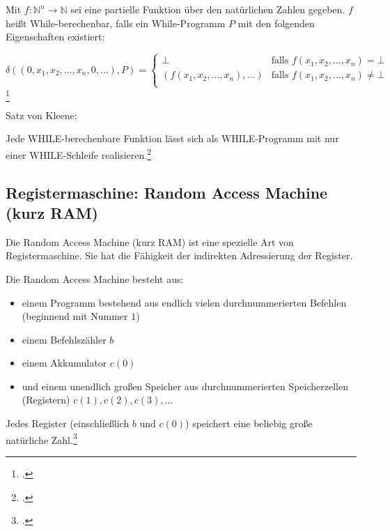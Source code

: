 \documentclass{bschlangaul-theorie}
\begin{document}
Mit $f : \mathbb{N}^n \rightarrow \mathbb{N}$ sei eine partielle
Funktion über den natürlichen Zahlen gegeben. $f$ heißt
While-berechenbar, falls ein While-Programm $P$ mit den folgenden
Eigenschaften existiert:

\begin{equation*}
\delta((0,x_1,x_2,\dots,x_n,0,\dots), P) =
\begin{cases}
\bot &
\text{falls } f(x_1,x_2,\dots,x_n) = \bot\\

(f(x_1,x_2,\dots,x_n), \dots) &
\text{falls }f(x_1,x_2,\dots,x_n) \neq \bot\\
\end{cases}
\end{equation*}\footcite[Seite 261]{hoffmann}

Satz von Kleene:

Jede WHILE-berechenbare Funktion lässt sich als WHILE-Programm mit nur
einer WHILE-Schleife realisieren.\footcite[Seite 13]{theo:fs:4}

%

\subsection{Registermaschine: Random Access Machine (kurz RAM)}

Die Random Access Machine (kurz RAM) ist eine spezielle Art von
Registermaschine. Sie hat die Fähigkeit der indirekten Adressierung der
Register.

Die Random Access Machine besteht aus:

\begin{itemize}
\item einem Programm bestehend aus endlich vielen durchnummerierten
Befehlen (beginnend mit Nummer $1$)

\item einem Befehlszähler $b$

\item einem Akkumulator $c(0)$

\item und einem unendlich großen Speicher aus durchnummerierten
Speicherzellen (Registern) $c(1), c(2), c(3), \dots$
\end{itemize}

Jedes Register (einschließlich $b$ und $c(0)$) speichert eine beliebig
große natürliche Zahl.\footcite{wiki:registermaschine}
\end{document}
